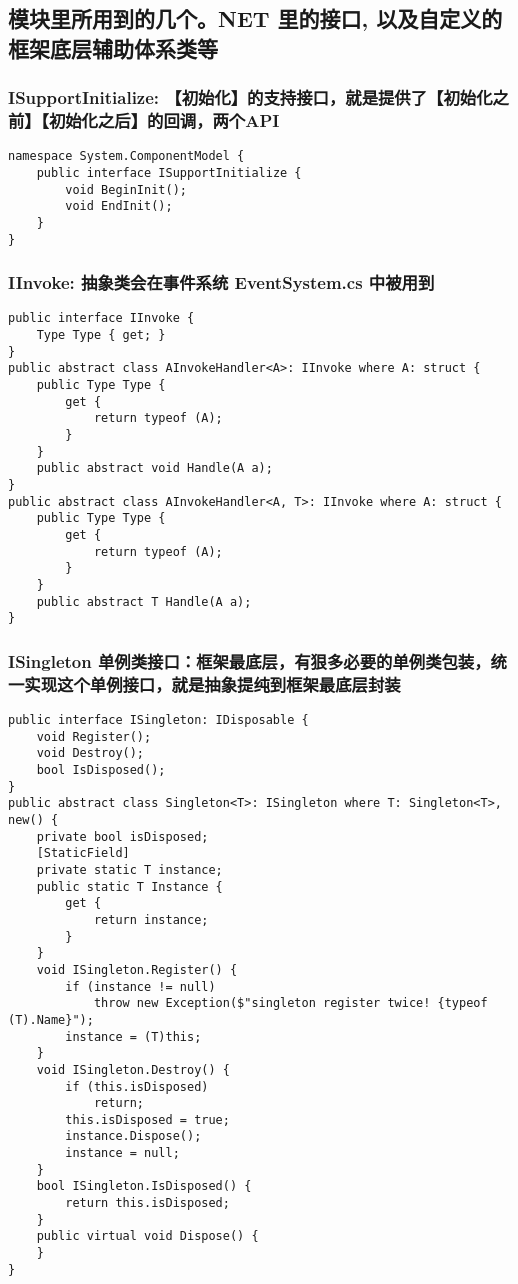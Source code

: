 \documentclass[9pt, b5paper]{article}
\begin{document}
\subsection{模块里所用到的几个。NET 里的接口, 以及自定义的框架底层辅助体系类等}
\label{sec-8-1}
\subsubsection{ISupportInitialize: 【初始化】的支持接口，就是提供了【初始化之前】【初始化之后】的回调，两个API}
\label{sec-8-1-1}
\begin{verbatim}
namespace System.ComponentModel {
    public interface ISupportInitialize {
        void BeginInit();
        void EndInit();
    }
}
\end{verbatim}
\subsubsection{IInvoke: 抽象类会在事件系统 EventSystem.cs 中被用到}
\label{sec-8-1-2}
\begin{verbatim}
public interface IInvoke {
    Type Type { get; }
}
public abstract class AInvokeHandler<A>: IInvoke where A: struct {
    public Type Type {
        get {
            return typeof (A);
        }
    }
    public abstract void Handle(A a);
}
public abstract class AInvokeHandler<A, T>: IInvoke where A: struct {
    public Type Type {
        get {
            return typeof (A);
        }
    }
    public abstract T Handle(A a);
}
\end{verbatim}
\subsubsection{ISingleton 单例类接口：框架最底层，有狠多必要的单例类包装，统一实现这个单例接口，就是抽象提纯到框架最底层封装}
\label{sec-8-1-3}
\begin{verbatim}
public interface ISingleton: IDisposable {
    void Register();
    void Destroy();
    bool IsDisposed();
}
public abstract class Singleton<T>: ISingleton where T: Singleton<T>, new() {
    private bool isDisposed;
    [StaticField]
    private static T instance;
    public static T Instance {
        get {
            return instance;
        }
    }
    void ISingleton.Register() {
        if (instance != null) 
            throw new Exception($"singleton register twice! {typeof (T).Name}");
        instance = (T)this;
    }
    void ISingleton.Destroy() {
        if (this.isDisposed) 
            return;
        this.isDisposed = true;
        instance.Dispose();
        instance = null;
    }
    bool ISingleton.IsDisposed() {
        return this.isDisposed;
    }
    public virtual void Dispose() {
    }
}
\end{verbatim}
\end{document}
